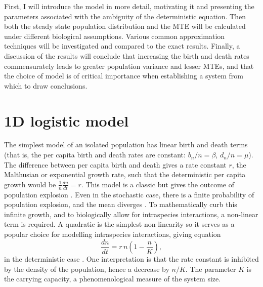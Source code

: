 First, I will introduce the model in more detail, motivating it and presenting the parameters associated with the ambiguity of the deterministic equation. 
Then both the steady state population distribution and the MTE will be calculated under different biological assumptions. 
Various common approximation techniques will be investigated and compared to the exact results. 
Finally, a discussion of the results will conclude that increasing the birth and death rates commensurately leads to greater population variance and lesser MTEs, and that the choice of model is of critical importance when establishing a system from which to draw conclusions. 
\fi


\section{1D logistic model}%

The simplest model of an isolated population has linear birth and death terms (that is, the per capita birth and death rates are constant: $b_n/n=\beta$, $d_n/n=\mu$). 
The difference between per capita birth and death gives a rate constant $r$, the Malthusian or exponential growth rate, such that the deterministic per capita growth would be $\frac{1}{n}\frac{dn}{dt} = r$. 
This model is a classic but gives the outcome of population explosion \cite{Malthus1798}. 
Even in the stochastic case, there is a finite probability of population explosion, and the mean diverges \cite{Nisbet1982}. 
To mathematically curb this infinite growth, and to biologically allow for intraspecies interactions, a non-linear term is required. 
A quadratic is the simplest non-linearity so it serves as a popular choice for modelling intraspecies interactions, giving equation
\begin{equation}
\frac{dn}{dt} = r\,n\left(1-\frac{n}{K}\right),
\label{logistic}
\end{equation}
in the deterministic case \cite{Greenhalgh1990,Ovaskainen2010,Assaf2010,Allen2003,Norden1982,Newman2004,Allen2005,Fujita1953,Nasell2001}. 
One interpretation is that the rate constant is inhibited by the density of the population, hence a decrease by $n/K$. %
The parameter $K$ is the carrying capacity, a phenomenological measure of the system size. 

